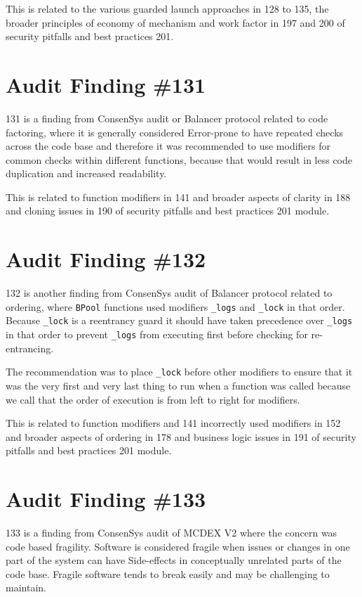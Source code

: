 This is related to the various guarded launch approaches in 128 to 135, the broader principles of economy of mechanism and work factor in 197 and 200 of security pitfalls and best practices 201.

\section{Audit Finding \#131}

131 is a finding from ConsenSys audit or Balancer protocol related to code factoring, where it is generally considered Error-prone to have repeated checks across the code base and therefore it was recommended to use modifiers for common checks within different functions, because that would result in less code duplication and increased readability.

This is related to function modifiers in 141 and broader aspects of clarity in 188 and cloning issues in 190 of security pitfalls and best practices 201 module.

\section{Audit Finding \#132}

132 is another finding from ConsenSys audit of Balancer protocol related to ordering, where \verb|BPool| functions used modifiers \verb|_logs| and \verb|_lock| in that order. Because \verb|_lock| is a reentrancy guard it should have taken precedence over \verb|_logs| in that order to prevent \verb|_logs| from executing first before checking for re-entrancing.

The recommendation was to place \verb|_lock| before other modifiers to ensure that it was the very first and very last thing to run when a function was called because we call that the order of execution is from left to right for modifiers.

This is related to function modifiers and 141 incorrectly used modifiers in 152 and broader aspects of ordering in 178 and business logic issues in 191 of security pitfalls and best practices 201 module.

\section{Audit Finding \#133}

133 is a finding from ConsenSys audit of MCDEX V2 where the concern was code based fragility. Software is considered fragile when issues or changes in one part of the system can have Side-effects in conceptually unrelated parts of the code base. Fragile software tends to break easily and may be challenging to maintain.

